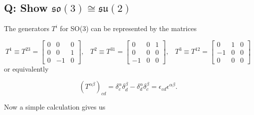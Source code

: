 \subsection{Q: Show $\mathfrak{so}(3)\cong \mathfrak{su}(2)$}

The generators $T^i$ for SO(3) can be represented by the matrices

\begin{equation*}
T^1 \equiv T^{23} = 
\begin{bmatrix} 0 & 0 & 0 \\
 0 & 0 & 1 \\
  0 & -1 & 0 
  \end{bmatrix},\;\;\;
T^2  \equiv T^{31}=
\begin{bmatrix} 0 & 0 & 1 \\
 0 & 0 & 0 \\
  -1 & 0 & 0 
  \end{bmatrix},\;\;\;
T^3 \equiv T^{12}=
\begin{bmatrix} 0 & 1 & 0 \\
 -1 & 0 & 0 \\
  0 & 0 & 0 
\end{bmatrix}
\end{equation*}
or equivalently

$$
(T^{\alpha \beta})_{cd}= {\delta}^\alpha_c {\delta}^\beta_d-{\delta}^\alpha_d {\delta}^\beta_c=\epsilon_{cd} \epsilon^{\alpha \beta}
.$$

Now a simple calculation gives us

